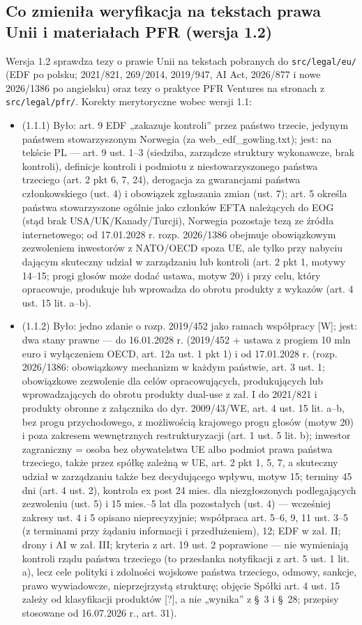 \documentclass[12pt,a4paper]{report}
\begin{document}
\subsection*{Co zmieniła weryfikacja na tekstach prawa Unii i materiałach PFR (wersja 1.2)}
Wersja 1.2 sprawdza tezy o prawie Unii na tekstach pobranych do \texttt{src/legal/eu/} (EDF po polsku; 2021/821, 269/2014, 2019/947, AI Act, 2026/877 i nowe 2026/1386 po angielsku) oraz tezy o praktyce PFR Ventures na stronach z \texttt{src/legal/pfr/}. Korekty merytoryczne wobec wersji 1.1:
\begin{itemize}
  \item (1.1.1) Było: art. 9 EDF „zakazuje kontroli” przez państwo trzecie, jedynym państwem stowarzyszonym Norwegia (za web\_edf\_gowling.txt); jest: na tekście PL — art. 9 ust. 1–3 (siedziba, zarządcze struktury wykonawcze, brak kontroli), definicje kontroli i podmiotu z niestowarzyszonego państwa trzeciego (art. 2 pkt 6, 7, 24), derogacja za gwarancjami państwa członkowskiego (ust. 4) i obowiązek zgłaszania zmian (ust. 7); art. 5 określa państwa stowarzyszone ogólnie jako członków EFTA należących do EOG (stąd brak USA/UK/Kanady/Turcji), Norwegia pozostaje tezą ze źródła internetowego; od 17.01.2028 r. rozp. 2026/1386 obejmuje obowiązkowym zezwoleniem inwestorów z NATO/OECD spoza UE, ale tylko przy nabyciu dającym skuteczny udział w zarządzaniu lub kontroli (art. 2 pkt 1, motywy 14–15; progi głosów może dodać ustawa, motyw 20) i przy celu, który opracowuje, produkuje lub wprowadza do obrotu produkty z wykazów (art. 4 ust. 15 lit. a–b).
  \item (1.1.2) Było: jedno zdanie o rozp. 2019/452 jako ramach współpracy [W]; jest: dwa stany prawne — do 16.01.2028 r. (2019/452 + ustawa z progiem 10 mln euro i wyłączeniem OECD, art. 12a ust. 1 pkt 1) i od 17.01.2028 r. (rozp. 2026/1386: obowiązkowy mechanizm w każdym państwie, art. 3 ust. 1; obowiązkowe zezwolenie dla celów opracowujących, produkujących lub wprowadzających do obrotu produkty dual-use z zał. I do 2021/821 i produkty obronne z załącznika do dyr. 2009/43/WE, art. 4 ust. 15 lit. a–b, bez progu przychodowego, z możliwością krajowego progu głosów (motyw 20) i poza zakresem wewnętrznych restrukturyzacji (art. 1 ust. 5 lit. b); inwestor zagraniczny = osoba bez obywatelstwa UE albo podmiot prawa państwa trzeciego, także przez spółkę zależną w UE, art. 2 pkt 1, 5, 7, a skuteczny udział w zarządzaniu także bez decydującego wpływu, motyw 15; terminy 45 dni (art. 4 ust. 2), kontrola ex post 24 mies. dla niezgłoszonych podlegających zezwoleniu (ust. 5) i 15 mies.–5 lat dla pozostałych (ust. 4) — wcześniej zakresy ust. 4 i 5 opisano nieprecyzyjnie; współpraca art. 5–6, 9, 11 ust. 3–5 (z terminami przy żądaniu informacji i przedłużeniem), 12; EDF w zał. II; drony i AI w zał. III; kryteria z art. 19 ust. 2 poprawione — nie wymieniają kontroli rządu państwa trzeciego (to przesłanka notyfikacji z art. 5 ust. 1 lit. a), lecz cele polityki i zdolności wojskowe państwa trzeciego, odmowy, sankcje, prawo wywiadowcze, nieprzejrzystą strukturę; objęcie Spółki art. 4 ust. 15 zależy od klasyfikacji produktów [?], a nie „wynika” z §~3 i §~28; przepisy stosowane od 16.07.2026 r., art. 31).

\end{itemize}
\end{document}
